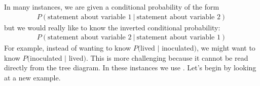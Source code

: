 In many instances, we are given a conditional probability of the form
\begin{align*}
P(\text{statement about variable 1}\ |\ \text{statement about variable 2})
\end{align*}
but we would really like to know the inverted conditional probability:
\begin{align*}
P(\text{statement about variable 2}\ |\ \text{statement about variable 1})
\end{align*}
For example, instead of wanting to know $P($lived $|$ inoculated$)$, we might want to know $P($inoculated $|$ lived$)$. This is more challenging because it cannot be read directly from the tree diagram. In these instances we use . Let's begin by looking at a new example.

\D{\newpage}

